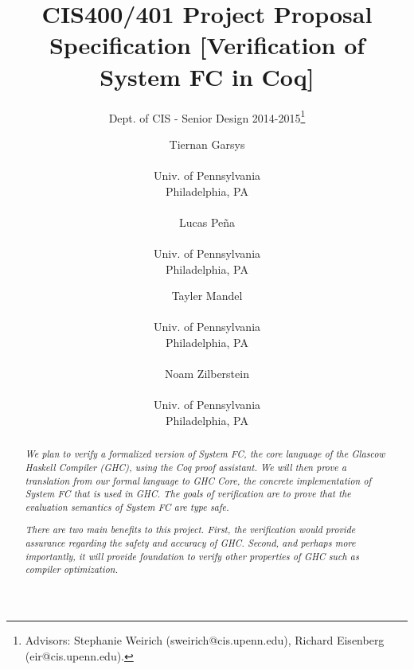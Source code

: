 \documentclass{sig-alternate}
\begin{document}
 

\title{CIS400/401 Project Proposal Specification [Verification of System FC in Coq]}
\subtitle{Dept. of CIS - Senior Design 2014-2015\thanks{Advisors: Stephanie Weirich (sweirich@cis.upenn.edu), Richard Eisenberg (eir@cis.upenn.edu).}}
\author{
  Tiernan Garsys \\  \\ Univ. of Pennsylvania \\ Philadelphia, PA\\\\
  Lucas Pe\~{n}a \\  \\ Univ. of Pennsylvania \\ Philadelphia, PA
  \and
  Tayler Mandel \\  \\ Univ. of Pennsylvania \\ Philadelphia, PA\\\\
  Noam Zilberstein \\  \\ Univ. of Pennsylvania \\ Philadelphia, PA
}
\date{}
\maketitle

\begin{abstract}
  \textit{
We plan to verify a formalized version of System FC, the core language of the Glascow Haskell Compiler (GHC), using the Coq proof assistant. We will then prove a translation from our formal language to GHC Core, the concrete implementation of System FC that is used in GHC. The goals of verification are to prove that the evaluation semantics of System FC are type safe.
  }

  \textit{
There are two main benefits to this project. First, the verification would provide assurance regarding the safety and accuracy of GHC. Second, and perhaps more importantly, it will provide foundation to verify other properties of GHC such as compiler optimization. 
 }
\end{abstract}
\end{document}

